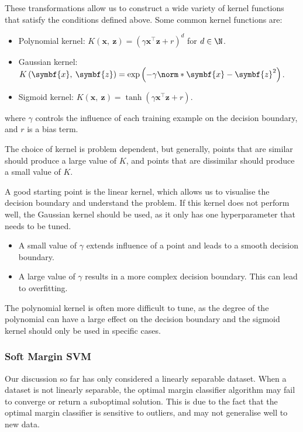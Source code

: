 \documentclass{article}
\begin{document}
These transformations allow us to construct a wide variety of kernel
functions that satisfy the conditions defined above. Some common kernel
functions are:
\begin{itemize}
    \item Polynomial kernel: \(K\left( \symbf{x},\: \symbf{z} \right) =
          {\left( \gamma \symbf{x}^\top \symbf{z} + r \right)}^d\) for
          \(d \in \N\).
    \item Gaussian kernel: \(K\left( \symbf{x},\: \symbf{z} \right) =
          \exp{\left( -\gamma \norm*{\symbf{x} - \symbf{z}}^2
          \right)}\).
    \item Sigmoid kernel: \(K\left( \symbf{x},\: \symbf{z} \right) =
          \tanh{\left( \gamma \symbf{x}^\top \symbf{z} + r \right)}\).
\end{itemize}
where \(\gamma\) controls the influence of each training example on the
decision boundary, and \(r\) is a bias term.

The choice of kernel is problem dependent, but generally, points that
are similar should produce a large value of \(K\), and points that are
dissimilar should produce a small value of \(K\).

A good starting point is the linear kernel, which allows us to
visualise the decision boundary and understand the problem. If this
kernel does not perform well, the Gaussian kernel should be used, as it
only has one hyperparameter that needs to be tuned.
\begin{itemize}
    \item A small value of \(\gamma\) extends influence of a point and
          leads to a smooth decision boundary.
    \item A large value of \(\gamma\) results in a more complex
          decision boundary. This can lead to overfitting.
\end{itemize}
The polynomial kernel is often more difficult to tune, as the degree of
the polynomial can have a large effect on the decision boundary and the
sigmoid kernel should only be used in specific cases.
\subsubsection{Soft Margin SVM}
Our discussion so far has only considered a linearly separable dataset.
When a dataset is not linearly separable, the optimal margin classifier
algorithm may fail to converge or return a suboptimal solution. This is
due to the fact that the optimal margin classifier is sensitive to
outliers, and may not generalise well to new data.
\end{document}
